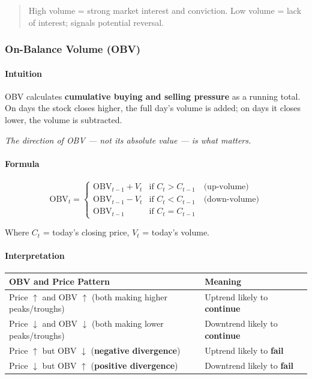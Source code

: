 \documentclass[12pt,openany]{book}
\begin{document}
\begin{quote}
High volume = strong market interest and conviction. Low volume = lack of interest; signals potential reversal.

\end{quote}

\subsubsection{On-Balance Volume (OBV)}

\paragraph{Intuition}
OBV calculates \textbf{cumulative buying and selling pressure} as a running total. On days the stock closes higher, the full day's volume is added; on days it closes lower, the volume is subtracted.

\emph{The direction of OBV --- not its absolute value --- is what matters.}

\paragraph{Formula}

\[
\text{OBV}_t = \begin{cases} \text{OBV}_{t-1} + V_t & \text{if } C_t > C_{t-1} \quad \text{(up-volume)} \\ \text{OBV}_{t-1} - V_t & \text{if } C_t < C_{t-1} \quad \text{(down-volume)} \\ \text{OBV}_{t-1} & \text{if } C_t = C_{t-1} \end{cases}
\]

Where \(C_t\) = today's closing price, \(V_t\) = today's volume.

\paragraph{Interpretation}

\begin{center}
\small
\renewcommand{\arraystretch}{1.2}
\begin{tabular}{|L{0.30\textwidth}|L{0.60\textwidth}|}
\hline
 \textbf{OBV and Price Pattern} & \textbf{Meaning} \\ \hline
 Price \(\uparrow\) and OBV \(\uparrow\) (both making higher peaks/troughs) & Uptrend likely to \textbf{continue} \\ \hline
 Price \(\downarrow\) and OBV \(\downarrow\) (both making lower peaks/troughs) & Downtrend likely to \textbf{continue} \\ \hline
 Price \(\uparrow\) but OBV \(\downarrow\) (\textbf{negative divergence}) & Uptrend likely to \textbf{fail} \\ \hline
 Price \(\downarrow\) but OBV \(\uparrow\) (\textbf{positive divergence}) & Downtrend likely to \textbf{fail} \\ \hline
\end{tabular}
\end{center}
\end{document}

